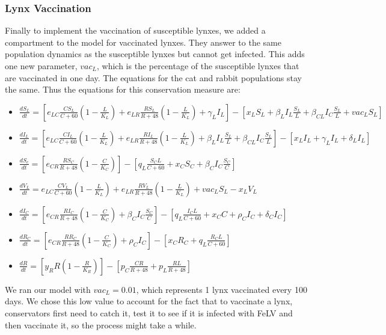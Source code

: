 \documentclass[12pt]{article}
\begin{document}
\subsubsection{Lynx Vaccination}
\quad Finally to implement the vaccination of susceptible lynxes, we added a compartment to the model for vaccinated lynxes. They answer to the same population dynamics as the susceptible lynxes but cannot get infected. This adds one new parameter, $vac_{L}$, which is the percentage of the susceptible lynxes that are vaccinated in one day. The equations for the cat and rabbit populations stay the same. Thus the equations for this conservation measure are: 
\begin{itemize}
    \item $\frac{dS_{L}}{dt} = [e_{LC}\frac{CS_{L}}{C + 60}(1 - \frac{L}{K_{L}}) + e_{LR}\frac{RS_{L}}{R + 48}(1 - \frac{L}{K_{L}}) + \gamma_{L}I_{L}] - [x_{L}S_{L} + \beta_{L}I_{L}\frac{S_{L}}{L} + \beta_{CL}I_{C}\frac{S_{L}}{L} + vac_{L}S_{L}]$
	\item $\frac{dI_{L}}{dt} = [e_{LC}\frac{CI_{L}}{C + 60}(1 - \frac{L}{K_{L}}) + e_{LR}\frac{RI_{L}}{R + 48}(1 - \frac{L}{K_{L}}) + \beta_{L}I_{L}\frac{S_{L}}{L} + \beta_{CL}I_{C}\frac{S_{L}}{L}] - [x_{L}I_{L} + \gamma_{L}I_{L} + \delta_{L}I_{L}]$
	\item $\frac{dS_{c}}{dt} = [e_{CR}\frac{RS_{C}}{R + 48}(1 - \frac{C}{K_{C}})] - [q_{L}\frac{S_{C}L}{C + 60} + x_{C}S_{C} + \beta_{C}I_{C}\frac{S_{C}}{C}]$
	\item $\frac{dV_{L}}{dt} = e_{LC}\frac{CV_{L}}{C + 60}(1 - \frac{L}{K_{L}}) + e_{LR}\frac{RV_{L}}{R + 48}(1 - \frac{L}{K_{L}}) + vac_{L}S_{L} - x_{L}V_{L}$
	\item $\frac{dI_{C}}{dt} = [e_{CR}\frac{RI_{C}}{R + 48}(1 - \frac{C}{K_{C}})  + \beta_{C}I_{C}\frac{S_{C}}{C}] - [q_{L}\frac{I_{C}L}{C + 60} + x_{C}C + \rho_{C}I_{C} + \delta_{C}I_{C}] $
	\item $\frac{dR_{C}}{dt} = [e_{CR}\frac{RR_{C}}{R + 48}(1 - \frac{C}{K_{C}}) + \rho_{C}I_{C}] - [x_{C}R_{C} + q_{L}\frac{R_{C}L}{C + 60}]$
	\item $\frac{dR}{dt} = [y_{R}R(1 - \frac{R}{K_{R}})] - [p_{C}\frac{CR}{R + 48} + p_{L}\frac{RL}{R + 48}]$
\end{itemize}
\quad We ran our model with $vac_{L} = 0.01$, which represents 1 lynx vaccinated every 100 days. We chose this low value to account for the fact that to vaccinate a lynx, conservators first need to catch it, test it to see if it is infected with FeLV and then vaccinate it, so the process might take a while. 
\end{document}
